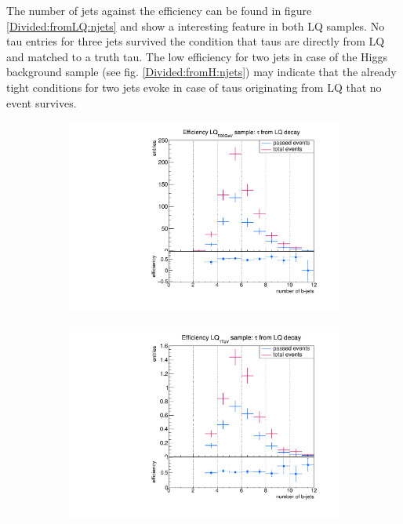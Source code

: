 %
The number of jets against the efficiency can be found in figure \ref{Divided:fromLQ:njets} and show a interesting feature in both LQ samples. No tau entries for three jets survived the condition that taus are directly from LQ and matched to a truth tau. The low efficiency for two jets in case of the Higgs background sample (see fig. \ref{Divided:fromH:njets}) may indicate that the already tight conditions for two jets evoke in case of taus originating from LQ that no event survives. 
%
\begin{figure}
  \centering
                \begin{subfigure}[t]{0.49\textwidth}
                \includegraphics[width=\textwidth]{figures/plots/LQ75/Divided_fromLQnjets.pdf}
                \label{DividedFromLQ:signal:njetsLQ75}
                \end{subfigure}
                \begin{subfigure}[t]{0.49\textwidth}
                \includegraphics[width=\textwidth]{figures/plots/LQ76/Divided_fromLQnjets.pdf}

\end{subfigure}
\end{figure}
